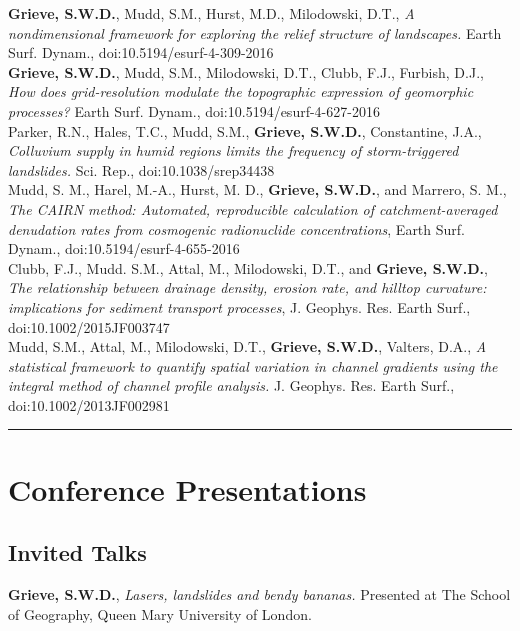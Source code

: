 \documentclass[10pt, a4paper]{article}
\newcommand{\years}[1]{\marginnote{\scriptsize #1}}
\begin{document}
\years{2016}\textbf{Grieve, S.W.D.}, Mudd, S.M., Hurst, M.D., Milodowski, D.T., \textit{A nondimensional framework for exploring the relief structure of landscapes.} Earth Surf. Dynam., doi:10.5194/esurf-4-309-2016\\[0.05cm]

\years{2016}\textbf{Grieve, S.W.D.}, Mudd, S.M., Milodowski, D.T., Clubb, F.J., Furbish, D.J., \textit{How does grid-resolution modulate the topographic expression of geomorphic processes?} Earth Surf. Dynam., doi:10.5194/esurf-4-627-2016\\[0.05cm]

\years{2016}Parker, R.N., Hales, T.C., Mudd, S.M., \textbf{Grieve, S.W.D.}, Constantine, J.A., \textit{Colluvium supply in humid regions limits the frequency of storm-triggered landslides.} Sci. Rep., doi:10.1038/srep34438 \\[0.05cm]

\years{2016}Mudd, S. M., Harel, M.-A., Hurst, M. D., \textbf{Grieve, S.W.D.}, and Marrero, S. M., \textit{The CAIRN method: Automated, reproducible calculation of catchment-averaged denudation rates from cosmogenic radionuclide concentrations}, Earth Surf. Dynam., doi:10.5194/esurf-4-655-2016 \\[0.05cm]

\years{2016}Clubb, F.J., Mudd. S.M., Attal, M., Milodowski, D.T., and \textbf{Grieve, S.W.D.}, \textit{The relationship between drainage density, erosion rate, and hilltop curvature: implications for sediment transport processes}, J. Geophys. Res. Earth Surf., doi:10.1002/2015JF003747 \\[0.05cm]

\years{2014}Mudd, S.M., Attal, M., Milodowski, D.T., \textbf{Grieve, S.W.D.}, Valters, D.A., \textit{A statistical framework to quantify spatial variation in channel gradients using the integral method of channel profile analysis.} J. Geophys. Res. Earth Surf., doi:10.1002/2013JF002981\\[0.05cm]

\hrule
\section*{Conference Presentations}

\subsection*{Invited Talks}

\years{2019}\textbf{Grieve, S.W.D.}, \textit{Lasers, landslides and bendy bananas.} Presented at The School of Geography, Queen Mary University of London.\\[0.05cm]
\end{document}
